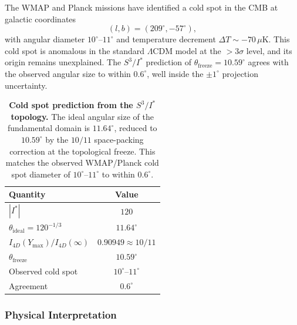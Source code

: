 \documentclass[a4paper,1pt,oneside,openany]{book}
\begin{document}
The WMAP and Planck missions have identified a cold spot in the CMB at galactic coordinates
\begin{equation}
(l, b) = (209^\circ, -57^\circ),
\label{eq:coldspot-position}
\end{equation}
with angular diameter $10^\circ$--$11^\circ$ and temperature decrement $\Delta T \sim -70\,\mu\mathrm{K}$. This cold spot is anomalous in the standard $\Lambda$CDM model at the $>3\sigma$ level, and its origin remains unexplained. The $S^3/I^*$ prediction of $\theta_{\mathrm{freeze}} = 10.59^\circ$ agrees with the observed angular size to within $0.6^\circ$, well inside the $\pm 1^\circ$ projection uncertainty.

\begin{table}[h]
\centering
\caption{\textbf{Cold spot prediction from the $S^3/I^*$ topology.} The ideal angular size of the fundamental domain is $11.64^\circ$, reduced to $10.59^\circ$ by the $10/11$ space-packing correction at the topological freeze. This matches the observed WMAP/Planck cold spot diameter of $10^\circ$--$11^\circ$ to within $0.6^\circ$.}
\label{tab:coldspot}
\begin{tabular}{@{}lc@{}}
\toprule
\textbf{Quantity} & \textbf{Value} \\
\midrule
$|I^*|$ & $120$ \\
$\theta_{\mathrm{ideal}} = 120^{-1/3}$ & $11.64^\circ$ \\
$I_{4D}(Y_{\max})/I_{4D}(\infty)$ & $0.90949 \approx 10/11$ \\
$\theta_{\mathrm{freeze}}$ & $10.59^\circ$ \\
Observed cold spot & $10^\circ$--$11^\circ$ \\
Agreement & $0.6^\circ$ \\
\bottomrule
\end{tabular}
\end{table}

\subsubsection{Physical Interpretation}
\end{document}
